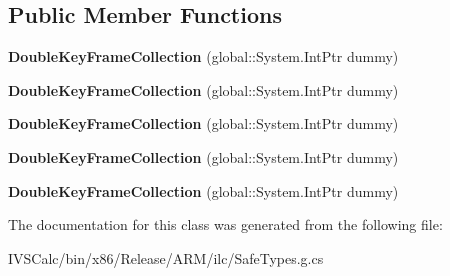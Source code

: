 \subsection*{Public Member Functions}
\begin{DoxyCompactItemize}
\item 
\mbox{\label{class_windows_1_1_u_i_1_1_xaml_1_1_media_1_1_animation_1_1_double_key_frame_collection_a9fde85fdc5f50f5a07bd4ffad0e39365}} 
{\bfseries Double\+Key\+Frame\+Collection} (global\+::\+System.\+Int\+Ptr dummy)
\item 
\mbox{\label{class_windows_1_1_u_i_1_1_xaml_1_1_media_1_1_animation_1_1_double_key_frame_collection_a9fde85fdc5f50f5a07bd4ffad0e39365}} 
{\bfseries Double\+Key\+Frame\+Collection} (global\+::\+System.\+Int\+Ptr dummy)
\item 
\mbox{\label{class_windows_1_1_u_i_1_1_xaml_1_1_media_1_1_animation_1_1_double_key_frame_collection_a9fde85fdc5f50f5a07bd4ffad0e39365}} 
{\bfseries Double\+Key\+Frame\+Collection} (global\+::\+System.\+Int\+Ptr dummy)
\item 
\mbox{\label{class_windows_1_1_u_i_1_1_xaml_1_1_media_1_1_animation_1_1_double_key_frame_collection_a9fde85fdc5f50f5a07bd4ffad0e39365}} 
{\bfseries Double\+Key\+Frame\+Collection} (global\+::\+System.\+Int\+Ptr dummy)
\item 
\mbox{\label{class_windows_1_1_u_i_1_1_xaml_1_1_media_1_1_animation_1_1_double_key_frame_collection_a9fde85fdc5f50f5a07bd4ffad0e39365}} 
{\bfseries Double\+Key\+Frame\+Collection} (global\+::\+System.\+Int\+Ptr dummy)
\end{DoxyCompactItemize}


The documentation for this class was generated from the following file\+:\begin{DoxyCompactItemize}
\item 
I\+V\+S\+Calc/bin/x86/\+Release/\+A\+R\+M/ilc/Safe\+Types.\+g.\+cs\end{DoxyCompactItemize}
